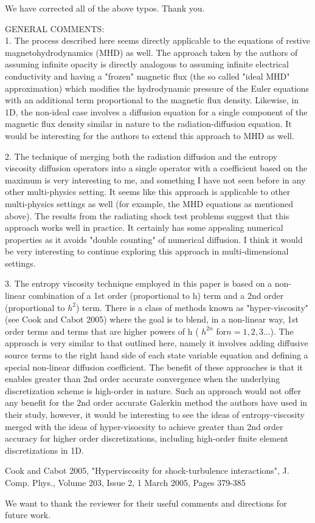 \documentclass{article}
\begin{document}
We have corrected all of the above typos. Thank you.
\bigskip


{
\color{blue}
\noindent
GENERAL COMMENTS: \\
1. The process described here seems directly applicable to the equations of restive magnetohydrodynamics (MHD) as well. The approach taken by the authors of assuming infinite opacity is directly analogous to assuming infinite electrical conductivity and having a "frozen" magnetic flux (the so called "ideal MHD" approximation) which modifies the hydrodynamic pressure of the Euler equations with an additional term proportional to the magnetic flux density. Likewise, in 1D, the non-ideal case involves a diffusion equation for a single component of the magnetic flux density similar in nature to the radiation-diffusion equation. It would be interesting for the authors to extend this approach to MHD as well.}
\bigskip


{
\color{blue}
2. The technique of merging both the radiation diffusion and the entropy viscosity diffusion operators into a single operator with a coefficient based on the maximum is very interesting to me, and something I have not seen before in any other multi-physics setting. It seems like this approach is applicable to other multi-physics settings as well (for example, the MHD equations as mentioned above). The results from the radiating shock test problems suggest that this approach works well in practice. It certainly has some appealing numerical properties as it avoids "double counting" of numerical diffusion. I think it would be very interesting to continue exploring this approach in multi-dimensional settings.
}
\bigskip


{
\color{blue}
3. The entropy viscosity technique employed in this paper is based on a non-linear combination of a 1st order (proportional to h) term and a 2nd order (proportional to $h^2$) term. There is a class of methods known as "hyper-viscosity" (see Cook and Cabot 2005) where the goal is to blend, in a non-linear way, 1st order terms and terms that are higher powers of h ( $h^{2n}$ for$ n = 1,2,3$...). The approach is very similar to that outlined here, namely it involves adding diffusive source terms to the right hand side of each state variable equation and defining a special non-linear diffusion coefficient. The benefit of these approaches is that it enables greater than 2nd order accurate convergence when the underlying discretization scheme is high-order in nature. Such an approach would not offer any benefit for the 2nd order accurate Galerkin method the authors have used in their study, however, it would be interesting to see the ideas of entropy-viscosity merged with the ideas of
hyper-visocsity to achieve greater than 2nd order accuracy for higher order discretizations, including high-order finite element discretizations in 1D.

Cook and Cabot 2005, "Hyperviscosity for shock-turbulence interactions", J. Comp. Phys., Volume 203, Issue 2, 1 March 2005, Pages 379-385
}
\bigskip

We want to thank the reviewer for their useful comments and directions for future work.
\end{document}
